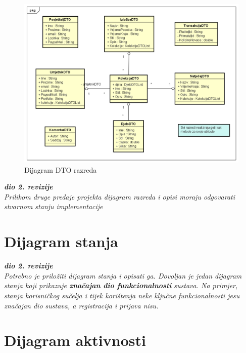 				\begin{figure}[H]
				
				\includegraphics[width=\textwidth,height=\textheight,keepaspectratio]{DTOdijagram}
				\caption{\newline Dijagram DTO razreda }
				
			\end{figure}
			
			\textbf{\textit{dio 2. revizije}}\\		
				
			
			
		
			\textit{Prilikom druge predaje projekta dijagram razreda i opisi moraju odgovarati stvarnom stanju implementacije}
			
			
			
			
			\eject
			
		\section{Dijagram stanja}
			
			
			\textbf{\textit{dio 2. revizije}}\\
			
			\textit{Potrebno je priložiti dijagram stanja i opisati ga. Dovoljan je jedan dijagram stanja koji prikazuje \textbf{značajan dio funkcionalnosti} sustava. Na primjer, stanja korisničkog sučelja i tijek korištenja neke ključne funkcionalnosti jesu značajan dio sustava, a registracija i prijava nisu. }
			
			
			\eject 
		
		\section{Dijagram aktivnosti}
			
